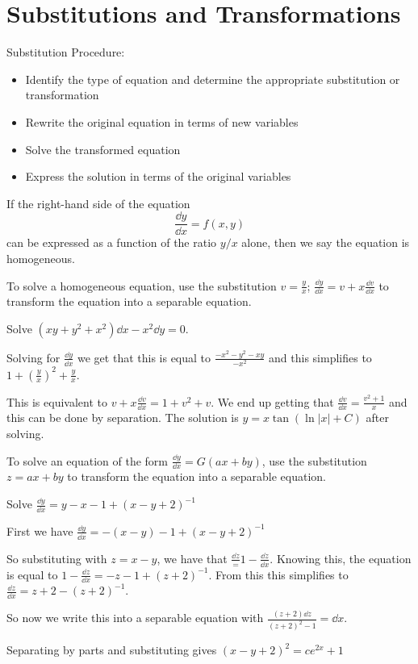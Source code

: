 \documentclass[../diffeq.tex]{subfiles}
\begin{document}
\section{Substitutions and Transformations}
Substitution Procedure:
\begin{itemize}
    \item Identify the type of equation and determine the appropriate substitution or transformation 
    \item Rewrite the original equation in terms of new variables 
    \item Solve the transformed equation 
    \item Express the solution in terms of the original variables 
\end{itemize}

\begin{definition}
    If the right-hand side of the equation
    \[ \frac{\dd y}{\dd x} = f(x,y) \]
    can be expressed as a function of the ratio $y/x$ alone, then we say the equation is homogeneous.
\end{definition}

To solve a homogeneous equation, use the substitution $v=\frac{y}{x}$; $\frac{\dd y}{\dd x} = v+x\frac{\dd v}{\dd x}$ to transform the equation into a separable equation.

\begin{example}
    Solve $(xy+y^2+x^2)\dd x - x^2\dd y = 0$.

    Solving for $\frac{\dd y}{\dd x}$ we get that this is equal to $\frac{-x^2-y^2-xy}{-x^2}$ and this simplifies to $1+\left(\frac{y}{x}\right)^2 + \frac{y}{x}$.

    This is equivalent to $v+x\frac{\dd v}{\dd x} = 1+v^2+v$. We end up getting that $\frac{\dd v}{\dd x}=\frac{v^2+1}{x}$ and this can be done by separation. The solution is $y=x\tan(\ln|x|+C)$ after solving.
\end{example}

To solve an equation of the form $\frac{\dd y}{\dd x}=G(ax+by)$, use the substitution $z=ax+by$ to transform the equation into a separable equation.
\begin{example}
    Solve $\frac{\dd y}{\dd x}=y-x-1+(x-y+2)^{-1}$

    First we have $\frac{\dd y}{\dd x}=-(x-y)-1+(x-y+2)^{-1}$

    So substituting with $z=x-y$, we have that $\frac{\dd z}=1-\frac{\dd z}{\dd x}$. Knowing this, the equation is equal to $1-\frac{\dd z}{\dd x}=-z-1+(z+2)^{-1}$. From this this simplifies to 
    $\frac{\dd z}{\dd x}=z+2-(z+2)^{-1}$. 

    So now we write this into a separable equation with $\frac{(z+2)\dd z}{(z+2)^2-1} = \dd x$.

    Separating by parts and substituting gives $(x-y+2)^2=ce^{2x}+1$
\end{example}
\end{document}
